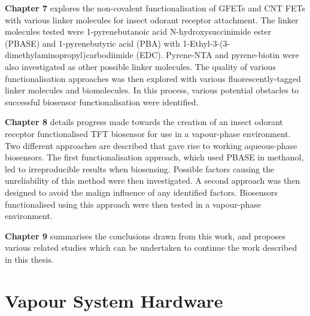 \documentclass[
  a4paper,
]{scrbook}
\begin{document}
\textbf{Chapter 7} explores the non-covalent functionalisation of GFETs
and CNT FETs with various linker molecules for insect odorant receptor
attachment. The linker molecules tested were 1-pyrenebutanoic acid
N-hydroxysuccinimide ester (PBASE) and 1-pyrenebutyric acid (PBA) with
1-Ethyl-3-(3-dimethylaminopropyl)carbodiimide (EDC). Pyrene-NTA and
pyrene-biotin were also investigated as other possible linker molecules.
The quality of various functionalisation approaches was then explored
with various fluorescently-tagged linker molecules and biomolecules. In
this process, various potential obstacles to successful biosensor
functionalisation were identified.

\textbf{Chapter 8} details progress made towards the creation of an
insect odorant receptor functionalised TFT biosensor for use in a
vapour-phase environment. Two different approaches are described that
gave rise to working aqueous-phase biosensors. The first
functionalisation approach, which used PBASE in methanol, led to
irreproducible results when biosensing. Possible factors causing the
unreliability of this method were then investigated. A second approach
was then designed to avoid the malign influence of any identified
factors. Biosensors functionalised using this approach were then tested
in a vapour-phase environment.

\textbf{Chapter 9} summarises the conclusions drawn from this work, and
proposes various related studies which can be undertaken to continue the
work described in this thesis.

\appendix
{}

\hypertarget{vapour-system-hardware}{%
\chapter{Vapour System Hardware}\label{vapour-system-hardware}}
\end{document}
